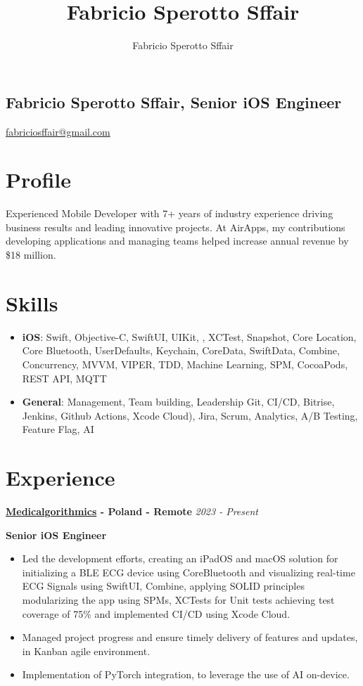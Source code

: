 \documentclass[11pt, oneside]{article}
\title{Fabricio Sperotto Sffair}
\author{Fabricio Sperotto Sffair}
\begin{document}
\begin{center}
    \section*{Fabricio Sperotto Sffair, Senior iOS Engineer}
    
    \href{https://www.linkedin.com/in/fabriciosffair/}{\faLinkedin \quad} \href{https://github.com/fabriciosffair}{\faGithub \quad}
    \href{mailto:fabriciosffair@gmail.com}{fabriciosffair@gmail.com}
\end{center}

\section*{Profile}

Experienced Mobile Developer with 7+ years of industry experience driving business results and leading innovative projects. At AirApps, my contributions developing applications and managing teams helped increase annual revenue by \$18 million.

\section*{Skills}

\begin{itemize}
    \item \textbf{iOS}: Swift, Objective-C, SwiftUI, UIKit, , XCTest, Snapshot, Core Location, Core Bluetooth, UserDefaults, Keychain, CoreData, SwiftData, Combine, Concurrency, MVVM, VIPER, TDD, Machine Learning, SPM, CocoaPods, REST API, MQTT
    \item \textbf{General}:  Management, Team building, Leadership Git, CI/CD, Bitrise, Jenkins, Github Actions, Xcode Cloud), Jira, Scrum, Analytics, A/B Testing, Feature Flag, AI
\end{itemize}

\section*{Experience}

\textbf{\href{https://www.medicalgorithmics.com}{Medicalgorithmics} - Poland - Remote}
\hfill
\textit{2023 - Present}

\textbf{Senior iOS Engineer}

\begin{itemize}
    \item Led the development efforts, creating an iPadOS and macOS solution for initializing a BLE ECG device using CoreBluetooth and visualizing real-time ECG Signals using SwiftUI, Combine, applying SOLID principles modularizing the app using SPMs, XCTests for Unit tests achieving test coverage of 75\%  and implemented CI/CD using Xcode Cloud.
    \item Managed project progress and ensure timely delivery of features and updates, in Kanban agile environment.
    \item Implementation of PyTorch integration, to leverage the use of AI on-device.
\end{itemize}
\end{document}
